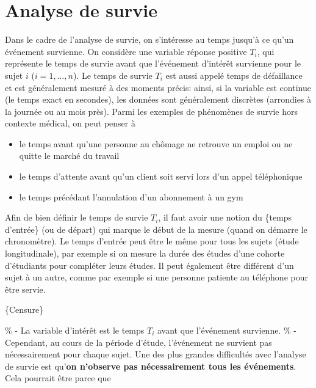 \documentclass[
  11pt,
  letterpaper,
]{article}
\providecommand{\tightlist}{%
  \setlength{\itemsep}{0pt}\setlength{\parskip}{0pt}}
\theoremstyle{definition}
\theoremstyle{definition}
\theoremstyle{definition}
\theoremstyle{definition}
\theoremstyle{remark}
\begin{document}
\hypertarget{survie}{%
\section{Analyse de survie}\label{survie}}

Dans le cadre de l'analyse de survie, on s'intéresse au temps jusqu'à ce qu'un événement survienne. On considère une variable réponse positive \(T_i\), qui représente le temps de survie avant que l'événement d'intérêt survienne pour le sujet \(i\) (\(i=1, \ldots, n\)). Le temps de survie \(T_i\) est aussi appelé temps de défaillance et est généralement mesuré à des moments précis: ainsi, si la variable est continue (le temps exact en secondes), les données sont généralement discrètes (arrondies à la journée ou au mois près).
Parmi les exemples de phénomènes de survie hors contexte médical, on peut penser à

\begin{itemize}
\tightlist
\item
  le temps avant qu'une personne au chômage ne retrouve un emploi ou ne quitte le marché du travail
\item
  le temps d'attente avant qu'un client soit servi lors d'un appel téléphonique
\item
  le temps précédant l'annulation d'un abonnement à un gym
\end{itemize}

Afin de bien définir le temps de survie \(T_i\), il faut avoir une notion du \{temps d'entrée\} (ou de départ) qui marque le début de la mesure (quand on démarre le chronomètre). Le temps d'entrée peut être le même pour tous les sujets (étude longitudinale), par exemple si on mesure la durée des études d'une cohorte d'étudiants pour compléter leurs études. Il peut également être différent d'un sujet à un autre, comme par exemple si une personne patiente au téléphone pour être servie.

\{Censure\}

\% - La variable d'intérêt est le temps \(T_i\) avant que l'événement survienne.
\% - Cependant, au cours de la période d'étude, l'événement ne survient pas nécessairement pour chaque sujet.
Une des plus grandes difficultés avec l'analyse de survie est qu'\textbf{on n'observe pas nécessairement tous les événements}.
Cela pourrait être parce que
\end{document}
